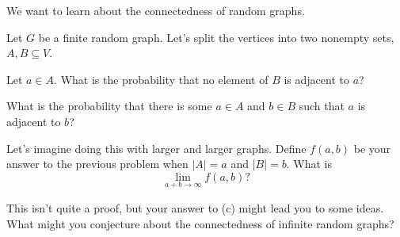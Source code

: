 \documentclass[12pt]{exam}
\begin{document}
We want to learn about the connectedness of random graphs.

Let $G$ be a finite random graph. Let's split the vertices into two nonempty sets, $A, B \subseteq V$.

\begin{qparts}
    \item Let $a \in A$. What is the probability that no element of $B$ is adjacent to $a$?
    \item What is the probability that there is some $a \in A$ and $b \in B$ such that $a$ is adjacent to $b$?
    \item Let's imagine doing this with larger and larger graphs. Define $f(a, b)$ be your answer to the previous problem when $|A| = a$ and $|B| = b$. What is
    \[ \lim_{a+b \to \infty} f(a,b)? \]
    \item This isn't quite a proof, but your answer to (c) might lead you to some ideas. What might you conjecture about the connectedness of infinite random graphs?
\end{qparts}
\begin{solution}
    ~\\~\\~\\~\\~\\~\\~\\~\\~\\~\\~\\~\\~\\~\\~\\~\\~\\~\\~\\~\\~\\~\\~\\~\\~\\~\\~\\~\\
    ~\\~\\~\\~\\~\\~\\~\\~\\
\end{solution}
\end{document}
